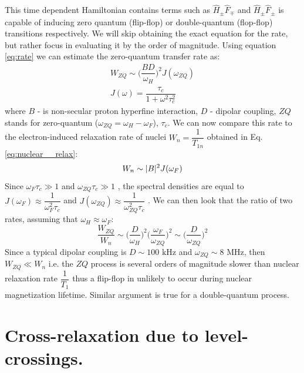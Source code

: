 \documentclass[a4paper, 12pt]{article}
\begin{document}
This time dependent Hamiltonian contains terms such as $\hat{H}_{\pm} \hat{F}_{\mp}$ and $\hat{H}_{\pm} \hat{F}_{\pm}$ is capable of inducing zero quantum (flip-flop) or double-quantum (flop-flop) transitions respectively. We will skip obtaining the exact equation for the rate, but rather focus in evaluating it by the order of magnitude. Using equation \ref{eq:rate} we can estimate the zero-quantum transfer rate as:
\begin{equation}
\begin{array}{cc}
W_{ZQ}  \sim \Big(  \dfrac{B D}{\omega_H} \Big) ^2 J(\omega_{ZQ}) \\
J(\omega) = \dfrac{\tau_c}{1+\omega^2\tau_c^2}
\end{array}
\end{equation}
where $B$ - is non-secular proton hyperfine interaction, $D$ - dipolar coupling, $ZQ$ stands for zero-quantum ($\omega_{ZQ} = \omega_H - \omega_F$), $\tau_c$.  We can now compare this rate to the electron-induced relaxation rate of nuclei $W_n = \dfrac{1}{T_{1n}}$ obtained in Eq.\ref{eq:nuclear__relax}:
\begin{equation}
W_{n}  \sim \vert B \vert ^2 J(\omega_F) \\
\end{equation}
Since $\omega_F \tau_c \gg 1$ and $\omega_{ZQ} \tau_c \gg 1$ ,  the spectral densities are equal to $J(\omega_F) \approx \dfrac{1}{\omega_F^2 \tau_c}$ and $J(\omega_{ZQ}) \approx \dfrac{1}{\omega_{ZQ}^2 \tau_c}$ . We can then look that the ratio of two rates, assuming that $\omega_H \approx \omega_F$:
\begin{equation}
\dfrac{W_{ZQ}}{W_n} \sim \Big( \dfrac{D}{\omega_H} \Big) ^2 \Big( \dfrac{\omega_F}{\omega_{ZQ}} \Big) ^2 \sim \Big( \dfrac{D}{\omega_{ZQ}} \Big) ^2
\end{equation}
Since a typical dipolar coupling is $D \sim 100 \text{ kHz}$ and $\omega_{ZQ} \sim 8 \text{ MHz}$, then $W_{ZQ} \ll W_n$ i.e. the $ZQ$ process is several orders of magnitude slower than nuclear relaxation rate $\dfrac{1}{T_1}$ thus a flip-flop in unlikely to occur during nuclear magnetization lifetime.  Similar argument is true for a double-quantum process. 


\section{Cross-relaxation due to level-crossings.}
\end{document}
